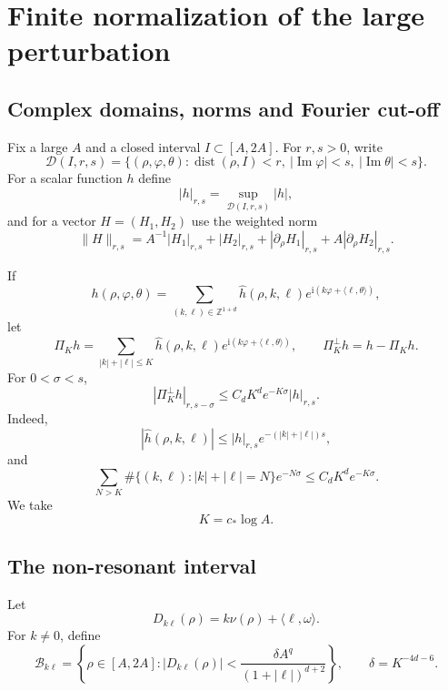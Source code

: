 \documentclass[11pt]{amsart}
\theoremstyle{remark}
\newcommand{\Z}{\mathbb Z}
\newcommand{\ii}{\mathrm i}
\newcommand{\norm}[1]{\lVert #1\rVert}
\newcommand{\cD}{\mathcal D}
\begin{document}
\section{Finite normalization of the large perturbation}

\subsection{Complex domains, norms and Fourier cut-off}

Fix a large $A$ and a closed interval
$I\subset[A,2A]$.  For $r,s>0$, write
\[
 \cD(I,r,s)=\{(\rho,\varphi,\theta):
 \operatorname{dist}(\rho,I)<r,\
 |\operatorname{Im}\varphi|<s,\
 |\operatorname{Im}\theta|<s\}.
\]
For a scalar function $h$ define
\[
 |h|_{r,s}=\sup_{\cD(I,r,s)}|h|,
\]
and for a vector $H=(H_1,H_2)$ use the weighted norm
\begin{equation}\label{eq:weightednorm}
 \norm{H}_{r,s}
 =A^{-1}|H_1|_{r,s}+|H_2|_{r,s}
  +|\partial_\rho H_1|_{r,s}
  +A|\partial_\rho H_2|_{r,s}.
\end{equation}

If
\[
 h(\rho,\varphi,\theta)
 =\sum_{(k,\ell)\in\Z^{1+d}}
 \widehat h(\rho,k,\ell)
 e^{\ii(k\varphi+\langle\ell,\theta\rangle)},
\]
let
\begin{equation}\label{eq:PiK}
 \Pi_Kh=\sum_{|k|+|\ell|\leq K}
 \widehat h(\rho,k,\ell)
 e^{\ii(k\varphi+\langle\ell,\theta\rangle)},\qquad
 \Pi_K^\perp h=h-\Pi_Kh .
\end{equation}
For $0<\sigma<s$,
\begin{equation}\label{eq:Fouriertail}
 |\Pi_K^\perp h|_{r,s-\sigma}
 \leq C_d K^d e^{-K\sigma}|h|_{r,s}.
\end{equation}
Indeed,
\[
 |\widehat h(\rho,k,\ell)|
 \leq |h|_{r,s}e^{-(|k|+|\ell|)s},
\]
and
\[
 \sum_{N>K}\#\{(k,\ell):|k|+|\ell|=N\}e^{-N\sigma}
 \leq C_dK^de^{-K\sigma}.
\]
We take
\begin{equation}\label{eq:K}
 K=c_*\log A.
\end{equation}

\subsection{The non-resonant interval}

Let
\begin{equation}\label{eq:divisor}
 D_{k\ell}(\rho)
 =k\nu(\rho)+\langle\ell,\omega\rangle.
\end{equation}
For $k\neq0$, define
\begin{equation}\label{eq:badset}
 \mathcal B_{k\ell}
 =\left\{\rho\in[A,2A]:
 |D_{k\ell}(\rho)|
 <\frac{\delta A^q}{(1+|\ell|)^{d+2}}\right\},
 \qquad \delta=K^{-4d-6}.
\end{equation}
\end{document}
